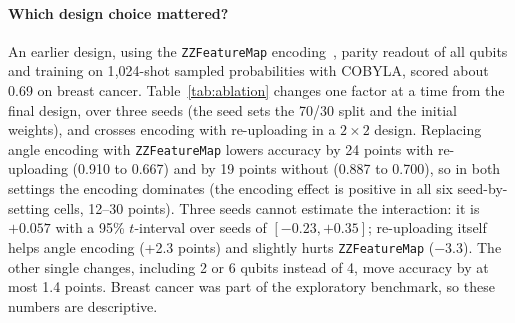 \documentclass[11pt]{article}
\begin{document}
\paragraph{Which design choice mattered?} An earlier design, using the \texttt{ZZFeatureMap} encoding~\cite{havlicek2019supervised}, parity readout of all qubits and training on 1{,}024-shot sampled probabilities with COBYLA, scored about 0.69 on breast cancer. Table~\ref{tab:ablation} changes one factor at a time from the final design, over three seeds (the seed sets the 70/30 split and the initial weights), and crosses encoding with re-uploading in a $2 \times 2$ design. Replacing angle encoding with \texttt{ZZFeatureMap} lowers accuracy by 24 points with re-uploading (0.910 to 0.667) and by 19 points without (0.887 to 0.700), so in both settings the encoding dominates (the encoding effect is positive in all six seed-by-setting cells, 12--30 points). Three seeds cannot estimate the interaction: it is $+0.057$ with a 95\% $t$-interval over seeds of $[-0.23, +0.35]$; re-uploading itself helps angle encoding (+2.3 points) and slightly hurts \texttt{ZZFeatureMap} ($-3.3$). The other single changes, including 2 or 6 qubits instead of 4, move accuracy by at most 1.4 points. Breast cancer was part of the exploratory benchmark, so these numbers are descriptive.

\begin{table}[h]
\centering
\small
{}
\caption{Ablation, mean $\pm$ std over 3 seeds (population std); the first four rows form a $2 \times 2$ design of encoding and re-uploading; all variants are evaluated with exact probabilities. This is a single dataset and should be read as indicative.}
\label{tab:ablation}
\end{table}
\end{document}
